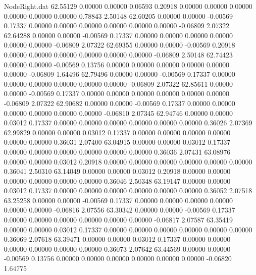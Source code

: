 \begin{filecontents}{NodeRight.dat}
  62.55129    0.00000    0.00000     0.06593    0.20918    0.00000    0.00000    0.00000    0.00000    0.00000    0.00000    0.78843    2.50148
  62.60205    0.00000    0.00000    -0.00569    0.17337    0.00000    0.00000    0.00000    0.00000    0.00000    0.00000   -0.06809    2.07322
  62.64288    0.00000    0.00000    -0.00569    0.17337    0.00000    0.00000    0.00000    0.00000    0.00000    0.00000   -0.06809    2.07322
  62.69355    0.00000    0.00000    -0.00569    0.20918    0.00000    0.00000    0.00000    0.00000    0.00000    0.00000   -0.06809    2.50148
  62.74423    0.00000    0.00000    -0.00569    0.13756    0.00000    0.00000    0.00000    0.00000    0.00000    0.00000   -0.06809    1.64496
  62.79496    0.00000    0.00000    -0.00569    0.17337    0.00000    0.00000    0.00000    0.00000    0.00000    0.00000   -0.06809    2.07322
  62.85611    0.00000    0.00000    -0.00569    0.17337    0.00000    0.00000    0.00000    0.00000    0.00000    0.00000   -0.06809    2.07322
  62.90682    0.00000    0.00000    -0.00569    0.17337    0.00000    0.00000    0.00000    0.00000    0.00000    0.00000   -0.06810    2.07345
  62.94746    0.00000    0.00000     0.03012    0.17337    0.00000    0.00000    0.00000    0.00000    0.00000    0.00000    0.36026    2.07369
  62.99829    0.00000    0.00000     0.03012    0.17337    0.00000    0.00000    0.00000    0.00000    0.00000    0.00000    0.36031    2.07400
  63.04915    0.00000    0.00000     0.03012    0.17337    0.00000    0.00000    0.00000    0.00000    0.00000    0.00000    0.36036    2.07431
  63.08976    0.00000    0.00000     0.03012    0.20918    0.00000    0.00000    0.00000    0.00000    0.00000    0.00000    0.36041    2.50310
  63.14049    0.00000    0.00000     0.03012    0.20918    0.00000    0.00000    0.00000    0.00000    0.00000    0.00000    0.36046    2.50348
  63.19147    0.00000    0.00000     0.03012    0.17337    0.00000    0.00000    0.00000    0.00000    0.00000    0.00000    0.36052    2.07518
  63.25258    0.00000    0.00000    -0.00569    0.17337    0.00000    0.00000    0.00000    0.00000    0.00000    0.00000   -0.06816    2.07556
  63.30342    0.00000    0.00000    -0.00569    0.17337    0.00000    0.00000    0.00000    0.00000    0.00000    0.00000   -0.06817    2.07587
  63.35419    0.00000    0.00000     0.03012    0.17337    0.00000    0.00000    0.00000    0.00000    0.00000    0.00000    0.36069    2.07618
  63.39471    0.00000    0.00000     0.03012    0.17337    0.00000    0.00000    0.00000    0.00000    0.00000    0.00000    0.36073    2.07642
  63.44569    0.00000    0.00000    -0.00569    0.13756    0.00000    0.00000    0.00000    0.00000    0.00000    0.00000   -0.06820    1.64775

\end{filecontents}
